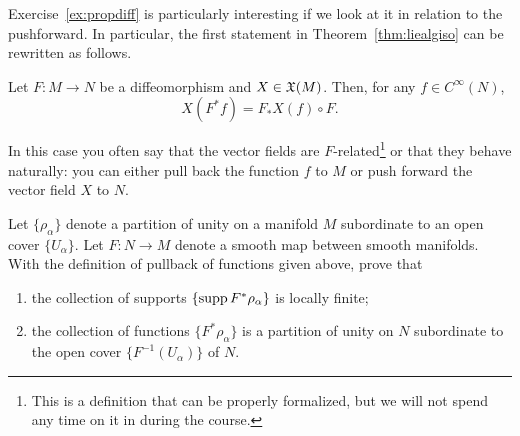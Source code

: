 Exercise~\ref{ex:propdiff} is particularly interesting if we look at it in relation to the pushforward.
In particular, the first statement in Theorem~\ref{thm:liealgiso} can be rewritten as follows.
\begin{proposition}
	Let $F:M\to N$ be a diffeomorphism and $X\in\mathfrak{X}(M)$.
	Then, for any $f\in C^\infty(N)$,
	\begin{equation}
		X(F^* f) = F_*X(f) \circ F.
	\end{equation}
\end{proposition}
In this case you often say that the vector fields are $F$-related\footnote{This is a definition that can be properly formalized, but we will not spend any time on it in during the course.} or that they behave naturally: you can either pull back the function $f$ to $M$ or push forward the vector field $X$ to $N$.

\begin{exercise}
	Let $\{\rho_\alpha\}$ denote a partition of unity on a manifold $M$ subordinate to an open cover $\{U_\alpha\}$.
	Let $F:N\to M$ denote a smooth map between smooth manifolds.
	With the definition of pullback of functions given above, prove that
	\begin{enumerate}
		\item the collection of supports $\{\operatorname{supp} F^*\rho_\alpha\}$ is locally finite;
		\item the collection of functions $\{F^*\rho_\alpha\}$ is a partition of unity on $N$ subordinate to the open cover $\{F^{-1}(U_\alpha)\}$ of $N$.
	\end{enumerate}
\end{exercise}

